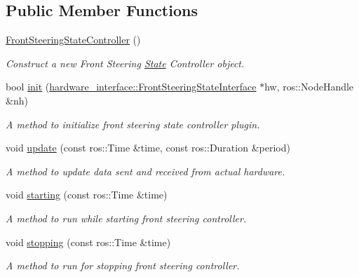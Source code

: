 \subsection*{Public Member Functions}
\begin{DoxyCompactItemize}
\item 
\mbox{\label{classfront__steering__state__controller_1_1FrontSteeringStateController_a9cc4c0139f25b6ca500c5e71e71b5dd7}} 
\hyperlink{classfront__steering__state__controller_1_1FrontSteeringStateController_a9cc4c0139f25b6ca500c5e71e71b5dd7}{Front\+Steering\+State\+Controller} ()
\begin{DoxyCompactList}\small\item\em Construct a new Front Steering \hyperlink{structState}{State} Controller object. \end{DoxyCompactList}\item 
bool \hyperlink{classfront__steering__state__controller_1_1FrontSteeringStateController_a8e5a8ca89d16e85900d3a79df1e75a29}{init} (\hyperlink{classhardware__interface_1_1FrontSteeringStateInterface}{hardware\+\_\+interface\+::\+Front\+Steering\+State\+Interface} $\ast$hw, ros\+::\+Node\+Handle \&nh)
\begin{DoxyCompactList}\small\item\em A method to initialize front steering state controller plugin. \end{DoxyCompactList}\item 
void \hyperlink{classfront__steering__state__controller_1_1FrontSteeringStateController_a3c8233a79607610b9c8c21084217268e}{update} (const ros\+::\+Time \&time, const ros\+::\+Duration \&period)
\begin{DoxyCompactList}\small\item\em A method to update data sent and received from actual hardware. \end{DoxyCompactList}\item 
void \hyperlink{classfront__steering__state__controller_1_1FrontSteeringStateController_acb8a5004ff18ed976ea25204947d0b94}{starting} (const ros\+::\+Time \&time)
\begin{DoxyCompactList}\small\item\em A method to run while starting front steering controller. \end{DoxyCompactList}\item 
void \hyperlink{classfront__steering__state__controller_1_1FrontSteeringStateController_a240b6e43acfd4f7ed4bfa159209183b6}{stopping} (const ros\+::\+Time \&time)
\begin{DoxyCompactList}\small\item\em A method to run for stopping front steering controller. \end{DoxyCompactList}\end{DoxyCompactItemize}


